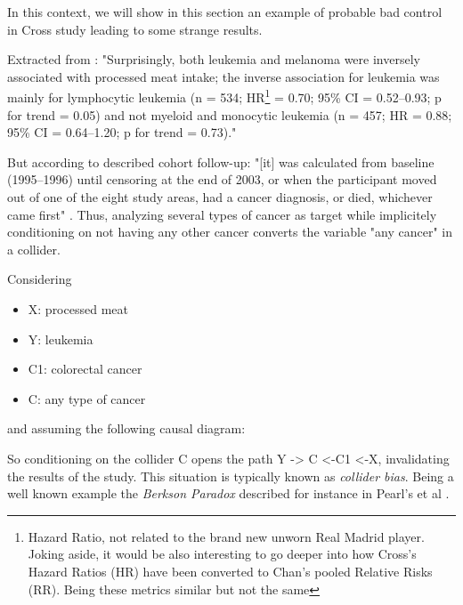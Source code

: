 \documentclass{article}
\begin{document}
In this context, we will show in this section an example of probable bad control in Cross study leading to some strange results.

Extracted from \cite{cross}: "Surprisingly, both leukemia and melanoma were inversely associated with processed meat intake; the inverse association for leukemia was mainly for lymphocytic leukemia (n = 534; HR\footnote{Hazard Ratio, not related to the brand new unworn Real Madrid player. Joking aside, it would be also interesting to go deeper into how Cross's Hazard Ratios (HR) have been converted to Chan's pooled Relative Risks (RR). Being these metrics similar but not the same} = 0.70; 95\% CI = 0.52–0.93; p for trend = 0.05) and not myeloid and monocytic leukemia (n = 457; HR = 0.88; 95\% CI = 0.64–1.20; p for trend = 0.73)."

But according to described cohort follow-up: "[it] was calculated from baseline (1995–1996) until censoring at the end of 2003, or when the participant moved out of one of the eight study areas, had a cancer diagnosis, or died, whichever came first" \cite{cross}. Thus, analyzing several types of cancer as target while implicitely conditioning on not having any other cancer converts the variable "any cancer" in a collider.

Considering
\begin{itemize}
\item X: processed meat
\item Y: leukemia
\item C1: colorectal cancer
\item C: any type of cancer
\end{itemize}

and assuming the following causal diagram:


So conditioning on the collider C opens the path Y -> C <-C1 <-X, invalidating the results of the study. This situation is typically known as \textit{collider bias}. Being a well known example the \textit{Berkson Paradox} described for instance in Pearl's et al \cite{bookofwhy}.
\end{document}
